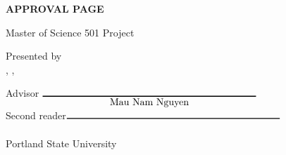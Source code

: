 
\begin{center}
{\large\bf APPROVAL PAGE}

\vspace{.5in}
Master of Science 501 Project

\vspace{.5in}
{\LARGE\bf\mythesistitle}

\vspace{.5in}
Presented by\\
\myname, \degreeoneshort, \degreetwoshort
\vspace{.75in}
\end{center}

\begin{center}
\begin{minipage}{4.5in}
Advisor \hfill$\underset{\hbox{\majoradvisor}}{\rule{3in}{1pt}}$\\[15pt]

Second reader\hfill$\underset{\hbox{\secondreader}}{\rule{3in}{1pt}}$\\[15pt]


\end{minipage}

\vspace{1in}
Portland State University\\
\myyear
\end{center}


\newpage



% 
